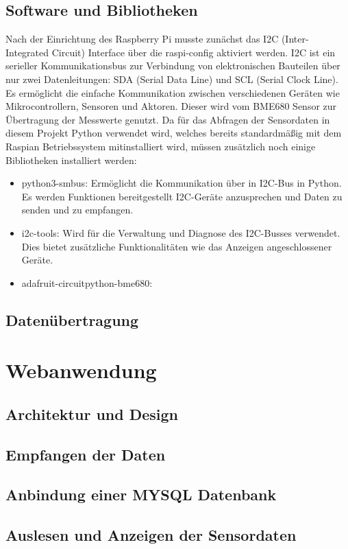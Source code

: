 \documentclass[conference]{IEEEtran}
\begin{document}
\subsection{Software und Bibliotheken}
Nach der Einrichtung des Raspberry Pi musste zunächst das I2C (Inter-Integrated Circuit) Interface über die raspi-config aktiviert werden. I2C  ist ein serieller Kommunikationsbus zur Verbindung von elektronischen Bauteilen über nur zwei Datenleitungen: SDA (Serial Data Line) und SCL (Serial Clock Line). Es ermöglicht die einfache Kommunikation zwischen verschiedenen Geräten wie Mikrocontrollern, Sensoren und Aktoren. Dieser wird vom BME680 Sensor zur Übertragung der Messwerte genutzt. Da für das Abfragen der Sensordaten in diesem Projekt Python verwendet wird, welches bereits standardmäßig mit dem Raspian Betriebssystem mitinstalliert wird, müssen zusätzlich noch einige Bibliotheken installiert werden: 
\begin{itemize}
	\item python3-smbus: Ermöglicht die Kommunikation über in I2C-Bus in Python. Es werden Funktionen bereitgestellt I2C-Geräte anzusprechen und Daten zu senden und zu empfangen.
	\item i2c-tools: Wird für die Verwaltung und Diagnose des I2C-Busses verwendet. Dies bietet zusätzliche Funktionalitäten wie das Anzeigen angeschlossener Geräte.
	\item adafruit-circuitpython-bme680: 
\end{itemize}

\subsection{Datenübertragung}


\section{Webanwendung}
\subsection{Architektur und Design}
\subsection{Empfangen der Daten}
\subsection{Anbindung einer MYSQL Datenbank}
\subsection{Auslesen und Anzeigen der Sensordaten}
\end{document}
